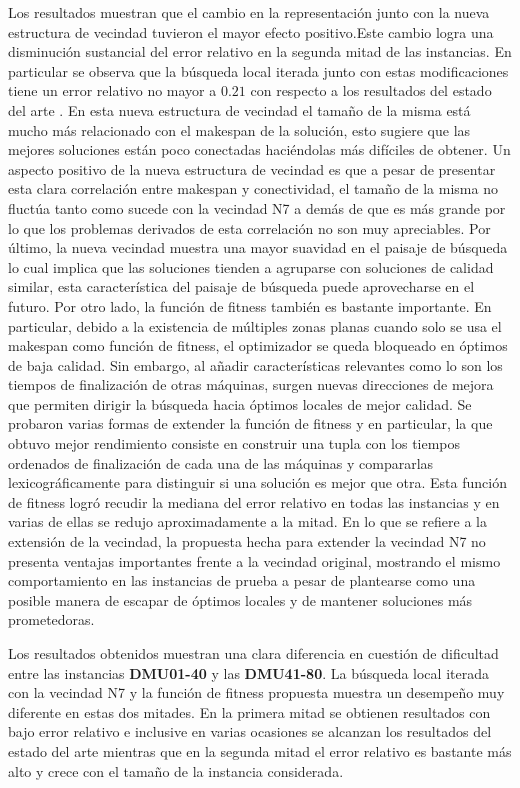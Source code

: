 %
Los resultados muestran que el cambio en la representación junto con la nueva estructura de vecindad tuvieron el mayor efecto positivo.Este cambio logra una disminución sustancial del error relativo en la segunda mitad de las instancias. En particular se observa que la búsqueda local iterada junto con estas modificaciones tiene un error relativo no mayor a $0.21$ con respecto a los resultados del estado del arte . En esta nueva estructura de vecindad el tamaño de la misma está mucho más relacionado con el makespan de la solución, esto sugiere que las mejores soluciones están poco conectadas haciéndolas más difíciles de obtener. Un aspecto positivo de la nueva estructura de vecindad es que a pesar de presentar esta clara correlación entre makespan y conectividad, el tamaño de la misma no fluctúa tanto como sucede con la vecindad N7 a demás de que es más grande por lo que los problemas derivados de esta correlación no son muy apreciables. Por último, la nueva vecindad muestra una mayor suavidad en el paisaje de búsqueda lo cual implica que las soluciones tienden a agruparse con soluciones de calidad similar, esta característica del paisaje de búsqueda puede aprovecharse en el futuro.
%
Por otro lado, la función de fitness también es bastante importante. En particular, debido a la existencia de múltiples zonas planas cuando solo se usa el makespan como función de fitness, el optimizador se queda bloqueado en óptimos de baja calidad. Sin embargo, al añadir características relevantes como lo son los tiempos de finalización de otras máquinas, surgen nuevas direcciones de mejora que permiten dirigir la búsqueda hacia óptimos locales de mejor calidad. Se probaron varias formas de extender la función de fitness y en particular, la que obtuvo mejor rendimiento consiste en construir una tupla con los tiempos ordenados de finalización de cada una de las máquinas y compararlas lexicográficamente para distinguir si una solución es mejor que otra. Esta función de fitness logró recudir la mediana del error relativo en todas las instancias y en varias de ellas se redujo aproximadamente a la mitad.
%
 En lo que se refiere a la extensión de la vecindad, la propuesta hecha para extender la vecindad N7 no presenta ventajas importantes frente a la vecindad original, mostrando el mismo comportamiento en las instancias de prueba a pesar de plantearse como una posible manera de escapar de óptimos locales y de mantener soluciones más prometedoras. 

Los resultados obtenidos muestran una clara diferencia en cuestión de dificultad entre las instancias \textbf{DMU01-40} y las \textbf{DMU41-80}. La búsqueda local iterada con la vecindad N7 y la función de fitness propuesta muestra un desempeño muy diferente en estas dos mitades. En la primera mitad se obtienen resultados con bajo error relativo e inclusive en varias ocasiones se alcanzan los resultados del estado del arte mientras que en la segunda mitad el error relativo es bastante más alto y crece con el tamaño de la instancia considerada. 
%

